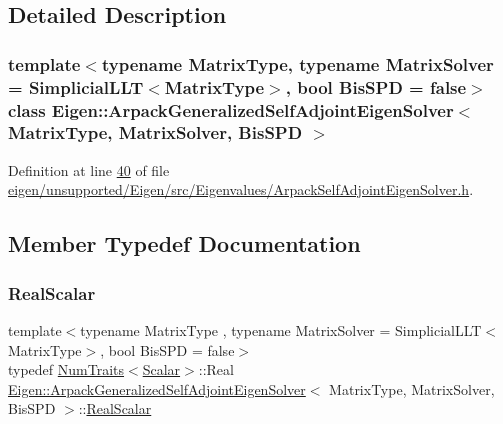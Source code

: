 \subsection{Detailed Description}
\subsubsection*{template$<$typename Matrix\+Type, typename Matrix\+Solver = Simplicial\+L\+L\+T$<$\+Matrix\+Type$>$, bool Bis\+S\+PD = false$>$\newline
class Eigen\+::\+Arpack\+Generalized\+Self\+Adjoint\+Eigen\+Solver$<$ Matrix\+Type, Matrix\+Solver, Bis\+S\+P\+D $>$}



Definition at line \hyperlink{eigen_2unsupported_2_eigen_2src_2_eigenvalues_2_arpack_self_adjoint_eigen_solver_8h_source_l00040}{40} of file \hyperlink{eigen_2unsupported_2_eigen_2src_2_eigenvalues_2_arpack_self_adjoint_eigen_solver_8h_source}{eigen/unsupported/\+Eigen/src/\+Eigenvalues/\+Arpack\+Self\+Adjoint\+Eigen\+Solver.\+h}.



\subsection{Member Typedef Documentation}
\mbox{\label{class_eigen_1_1_arpack_generalized_self_adjoint_eigen_solver_a2555af55e53bf9de894a49e639be2e1e}} 
\subsubsection{\texorpdfstring{Real\+Scalar}{RealScalar}\hspace{0.1cm}{\footnotesize\ttfamily [1/2]}}
{\footnotesize\ttfamily template$<$typename Matrix\+Type , typename Matrix\+Solver  = Simplicial\+L\+L\+T$<$\+Matrix\+Type$>$, bool Bis\+S\+PD = false$>$ \\
typedef \hyperlink{group___core___module_struct_eigen_1_1_num_traits}{Num\+Traits}$<$\hyperlink{class_eigen_1_1_arpack_generalized_self_adjoint_eigen_solver_ab1182405bfe87a505d4b7a8311c661ec}{Scalar}$>$\+::Real \hyperlink{class_eigen_1_1_arpack_generalized_self_adjoint_eigen_solver}{Eigen\+::\+Arpack\+Generalized\+Self\+Adjoint\+Eigen\+Solver}$<$ Matrix\+Type, Matrix\+Solver, Bis\+S\+PD $>$\+::\hyperlink{class_eigen_1_1_arpack_generalized_self_adjoint_eigen_solver_a2555af55e53bf9de894a49e639be2e1e}{Real\+Scalar}}




